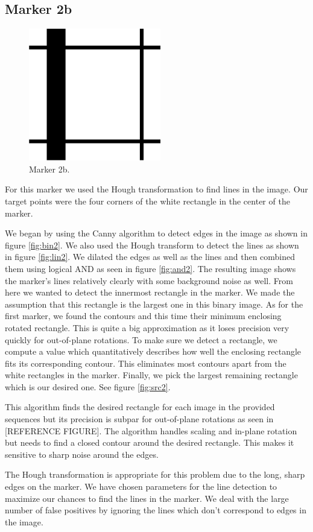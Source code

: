 \documentclass[]{scrartcl}
\begin{document}
\subsection{Marker 2b}
\begin{figure}
	\centering
	\includegraphics[width=0.4\linewidth]{fig/marker2b.png}
	\caption{Marker 2b.}
	\label{fig:mar2}
\end{figure}
For this marker we used the Hough transformation to find lines in the image. Our target points were the four corners of the white rectangle in the center of the marker.\par
We began by using the Canny algorithm to detect edges in the image as shown in figure \ref{fig:bin2}. We also used the Hough transform to detect the lines as shown in figure \ref{fig:lin2}. We dilated the edges as well as the lines and then combined them using logical AND as seen in figure \ref{fig:and2}. The resulting image shows the marker's lines relatively clearly with some background noise as well. From here we wanted to detect the innermost rectangle in the marker. We made the assumption that this rectangle is the largest one in this binary image. As for the first marker, we found the contours and this time their minimum enclosing rotated rectangle. This is quite a big approximation as it loses precision very quickly for out-of-plane rotations. To make sure we detect a rectangle, we compute a value which quantitatively describes how well the enclosing rectangle fits its corresponding contour. This eliminates most contours apart from the white rectangles in the marker. Finally, we pick the largest remaining rectangle which is our desired one. See figure \ref{fig:src2}.\par
This algorithm finds the desired rectangle for each image in the provided sequences but its precision is subpar for out-of-plane rotations as seen in [REFERENCE FIGURE]. The algorithm handles scaling and in-plane rotation but needs to find a closed contour around the desired rectangle. This makes it sensitive to sharp noise around the edges.\par
The Hough transformation is appropriate for this problem due to the long, sharp edges on the marker. We have chosen parameters for the line detection to maximize our chances to find the lines in the marker. We deal with the large number of false positives by ignoring the lines which don't correspond to edges in the image.\par
\end{document}
